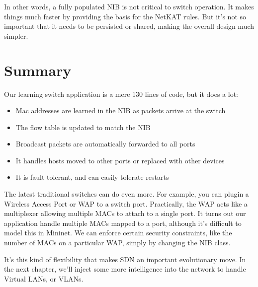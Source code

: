 In other words, a fully populated NIB is not critical to switch operation.  It makes things much faster
by providing the basis for the NetKAT rules.  But it's not so important that it needs to be persisted or
shared, making the overall design much simpler.  

\section{Summary}

Our learning switch application is a mere 130 lines of code, but it does a lot:

\begin{itemize}
\item Mac addresses are learned in the NIB as packets arrive at the switch
\item The flow table is updated to match the NIB
\item Broadcast packets are automatically forwarded to all ports
\item It handles hosts moved to other ports or replaced with other devices
\item It is fault tolerant, and can easily tolerate restarts
\end{itemize}

The latest traditional switches can do even more.  For example, you can plugin a Wireless Access Port or 
WAP to a switch port.  Practically, the WAP acts like a multiplexer allowing multiple MACs to 
attach to a single port.   It turns out our application handle multiple MACs mapped to a port, although it's 
difficult to model this in Mininet.  We can enforce certain security constraints, like the number of MACs on
a particular WAP, simply by changing the NIB class.

It's this kind of flexibility that makes SDN an important evolutionary move.  In the next chapter, we'll
inject some more intelligence into the network to handle Virtual LANs, or VLANs. 